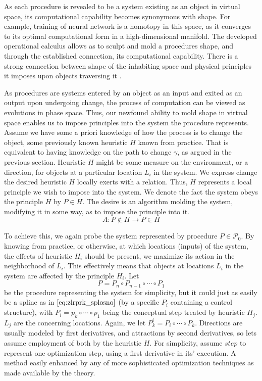 \documentclass{article}
\newcommand{\dP}{\mathcal{P}}
\begin{document}
As each procedure is revealed to be a system existing as an object in virtual space, its computational capability becomes synonymous with shape. For example, training of neural network is a homotopy in this space, as it converges to its optimal computational form in a high-dimensional manifold.
The developed operational calculus allows as to sculpt and mold a procedures shape, and through the established connection, its computational capability. There is a strong connection between shape of the inhabiting space and physical principles it imposes upon objects traversing it \cite{GeneralCovariance}.

As procedures are systems entered by an object as an input and exited as an output upon undergoing change, the process of computation can be viewed as evolutions in phase space. Thus, our newfound ability to mold shape in virtual space enables us to impose principles into the system the procedure represents. Assume we have some a priori knowledge of how the process is to change the object, some previously known heuristic $H$ known from practice. That is equivalent to having knowledge on the path to change $\gamma$, as argued in the previous section. Heuristic $H$ might be some measure on the environment, or a direction, for objects at a particular location $L_i$ in the system. We express change the desired heuristic $H$ locally exerts with a relation.
Thus, $H$ represents a local principle we wish to impose into the system. We denote the fact the system obeys the principle $H$ by $P\in H$. The desire is an algorithm molding the system, modifying it in some way, as to impose the principle into it.
\begin{equation}\label{eq:impose}
A:P\notin H\to P\in H
\end{equation}

To achieve this, we again probe the system represented by procedure $P\in\dP_0$. By knowing from practice, or otherwise, at which locations (inputs) of the system, the effects of heuristic $H_i$ should be present, we maximize its action in the neighborhood of $L_i$. This effectively means that objects at locations $L_i$ in the system are affected by the principle $H_i$.
Let
\begin{equation}
P=P_n\circ P_{n-1}\circ\cdots\circ P_1
\end{equation}
be the procedure representing the system for simplicity, but it could just as easily be a spline as in $\eqref{eq:zlrprk_splosno}$ (by a specific $P_i$ containing a control structure), with $P_i=p_k\circ\cdots\circ p_1$ being the conceptual step treated by heuristic $H_j$. $L_j$ are the concerning locations. Again, we let $P^i_k=P_i\circ\cdots\circ P_k$. Directions are usually modeled by first derivatives, and attractions by second derivatives, so lets assume employment of both by the heuristic $H$. For simplicity, assume $step$ to represent one optimization step, using a first derivative in its' execution. A method easily enhanced by any of more sophisticated optimization techniques as made available by the theory.
\end{document}

